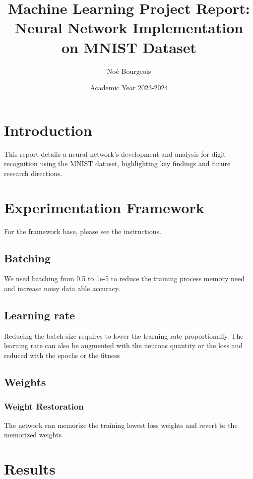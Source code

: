 \documentclass[utf8,1pt]{extarticle} %
\title{Machine Learning Project Report: Neural Network Implementation on MNIST Dataset}
\author{Noé Bourgeois}
\date{Academic Year 2023-2024}
\begin{document}
\maketitle

\newpage
\section{Introduction}
This report details a neural network's development and analysis for digit recognition using the MNIST dataset, highlighting key findings and future research directions.
\section{Experimentation Framework}
For the framework base,
please see the instructions.
\subsection{Batching}
We used batching from 0.5 to 1e-5
to reduce the training process memory need and increase noisy data able accuracy.
 
 \subsection{Learning rate}
 Reducing the batch size requires to lower the learning rate proportionally.
 The learning rate can also be augmented with the neurons quantity or the loss
 and reduced with the epochs or the fitness

 \subsection{Weights}
\subsubsection{Weight Restoration}
The network can memorize the training lowest loss weights and revert to the memorized weights. 

\section{Results}
\end{document}
